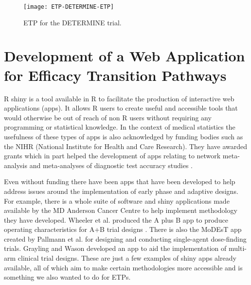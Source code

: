 \begin{sidewaysfigure}[h!]
	\centering
	\caption{ETP for the DETERMINE trial.}
	\label{fig_etp:DETERMINE-ETP}
	\texttt{[image: ETP-DETERMINE-ETP]}
\end{sidewaysfigure} 

\clearpage


\section{Development of a Web Application for Efficacy Transition Pathways}

R shiny \cite{changShinyWebApplication}  is a tool available in R to facilitate the production of interactive web applications (apps). It allows R users to create useful and accessible tools that would otherwise be out of reach of non R users without requiring any programming or statistical knowledge. In the context of medical statistics the usefulness of these types of apps is also acknowledged by funding bodies such as the NIHR (National Institute for Health and Care Research). They have awarded grants which in part helped the development of apps relating to network meta-analysis \cite{owenMetaInsightInteractiveWebbased2019} and meta-analyses of diagnostic test accuracy studies \cite{freemanDevelopmentInteractiveWebbased2019, patelGraphicalEnhancementsSummary2021}. 

Even without funding there have been apps that have been developed to help address issues around the implementation of early phase and adaptive designs. For example, there is a whole suite of software and shiny applications made available by the MD Anderson Cancer Centre \cite{tidwellBayesianClinicalTrials2019} to help implement methodology they have developed. Wheeler et al. \cite{wheelerAplusBWebApplication2016} produced the A plus B app to produce operating characteristics for A+B trial designs \cite{linStatisticalPropertiesTraditional2001}. There is also the MoDEsT app created by Pallmann et al. \cite{pallmannDesigningEvaluatingDoseescalation2020} for designing and conducting single-agent dose-finding trials. Grayling and Wason \cite{graylingWebApplicationDesign2020} developed an app to aid the implementation of multi-arm clinical trial designs. These are just a few examples of shiny apps already available, all of which aim to make certain methodologies more accessible and is something we also wanted to do for ETPs. 

